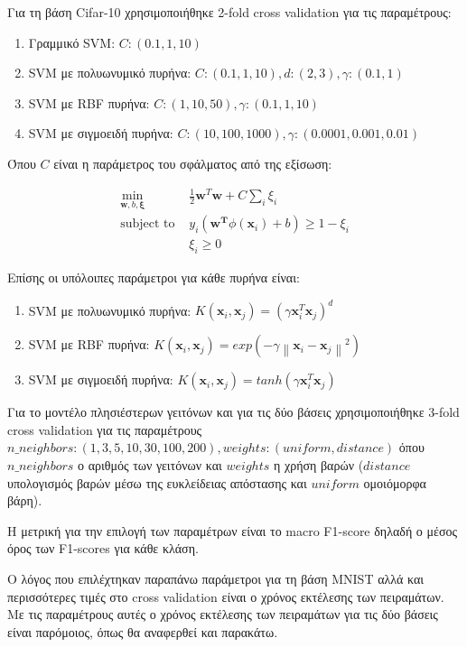 \documentclass[a4paper]{article}
\newcommand{\norm}[1]{\left\lVert#1\right\rVert}
\begin{document}
Για τη βάση Cifar-10 χρησιμοποιήθηκε 2-fold cross validation για τις
παραμέτρους:

\begin{enumerate}
    \item Γραμμικό SVM: $C: (0.1, 1, 10)$
    \item SVM με πολυωνυμικό πυρήνα: $C: (0.1, 1, 10), d: (2, 3), \gamma:
        (0.1, 1)$
    \item SVM με RBF πυρήνα: $C: (1, 10, 50), \gamma: (0.1, 1, 10)$
    \item SVM με σιγμοειδή πυρήνα: $C: (10, 100, 1000), \gamma: (0.0001, 0.001,
        0.01)$
\end{enumerate}

Όπου $C$ είναι η παράμετρος του σφάλματος από της εξίσωση:

\begin{equation*}
\begin{split}
    \min_{\bm{w},b,\bm{\xi}} & \frac{1}{2} \bm{w}^T\bm{w} + C \sum_{i} \xi_{i} \\
    \text{subject to } & y_i (\bm{w^T} \phi (\bm{x}_i) + b) \ge 1 - \xi_i \\
     & \xi_i \ge 0
\end{split}
\end{equation*}

Επίσης οι υπόλοιπες παράμετροι για κάθε πυρήνα είναι:

\begin{enumerate}
    \item SVM με πολυωνυμικό πυρήνα: $K(\bm{x}_i,\bm{x}_j) = (\gamma \bm{x}_i^T
        \bm{x}_j)^d$
    \item SVM με RBF πυρήνα: $K(\bm{x}_i,\bm{x}_j) = exp(-\gamma
        \norm{\bm{x}_i - \bm{x}_j}^2)$
    \item SVM με σιγμοειδή πυρήνα: $K(\bm{x}_i,\bm{x}_j) = tanh(\gamma
        \bm{x}_i^T \bm{x}_j)$
\end{enumerate}

Για το μοντέλο πλησιέστερων γειτόνων και για τις δύο βάσεις χρησιμοποιήθηκε
3-fold cross validation για τις παραμέτρους $n\_neighbors: (1, 3, 5, 10, 30,
100, 200), weights: (uniform, distance)$ όπου $n\_neighbors$ ο αριθμός των
γειτόνων και $weights$ η χρήση βαρών ($distance$ υπολογισμός βαρών μέσω της
ευκλείδειας απόστασης και $uniform$ ομοιόμορφα βάρη).

Η μετρική για την επιλογή των παραμέτρων είναι το macro F1-score δηλαδή ο μέσος
όρος των F1-scores για κάθε κλάση.

Ο λόγος που επιλέχτηκαν παραπάνω παράμετροι για τη βάση MNIST αλλά και
περισσότερες τιμές στο cross validation είναι ο χρόνος εκτέλεσης των πειραμάτων.
Με τις παραμέτρους αυτές ο χρόνος εκτέλεσης των πειραμάτων για τις δύο βάσεις
είναι παρόμοιος, όπως θα αναφερθεί και παρακάτω.
\end{document}
